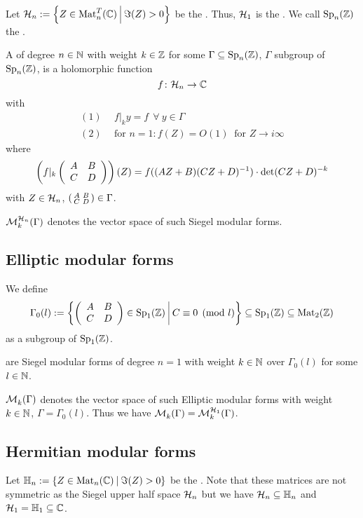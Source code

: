 Let $\SiegelHalfPlane_n := \Set{Z \in \M_n^T(\C)}{\Im(Z) > 0}$ be the .
Thus, $\mathcal{H}_1$ is the .
We call $\operatorname{Sp}_n(\mathbb{Z})$ the .


A  of degree $n\in\mathbb{N}$ with weight $k \in \mathbb{Z}$ for some $\Gamma \subseteq \operatorname{Sp}_n(\mathbb{Z})$, $\Gamma$ subgroup of $\operatorname{Sp}_n(\mathbb{Z})$, is a holomorphic function
\[ f \colon \mathcal{H}_n \rightarrow \mathbb{C} \]
with
\begin{align*}
(1) \ \ & f |_k y = f \ \ \forall \ y \in \Gamma \\
(2) \ \ & \text{for } n = 1 \colon f(Z) = O(1) \ \text{ for } Z \rightarrow i \infty
\end{align*}
where
\[ \left( f|_k \left( \begin{array}{cc} A & B \\ C & D \end{array} \right) \right) (Z) =
f((AZ + B)(CZ + D)^{-1}) \cdot \det(CZ + D)^{-k} \]
with $Z \in \mathcal{H}_n$, $\left( \begin{smallmatrix} A & B \\ C & D \end{smallmatrix} \right) \in \Gamma$.

$\operatorname{\mathcal{M}}^{\mathcal{H}_{n}}_k (\Gamma)$ denotes the vector space of such Siegel modular forms.

\subsection{Elliptic modular forms}

We define
\[ \Gamma_0(l) := \Set{\SimpleMatrix{A}{B}{C}{D} \in \Sp_1(\Z)}{C \equiv 0 \pmod{l}} \subseteq \Sp_1(\Z) \subseteq \M_2(\Z) \]
as a subgroup of $\operatorname{Sp}_1(\mathbb{Z})$.

 are Siegel modular forms of degree $n=1$ with weight $k \in \mathbb{N}$ over $\Gamma_0(l)$ for some $l \in \mathbb{N}$.

$\operatorname{\mathcal{M}}^{}_k (\Gamma)$ denotes the vector space of such Elliptic modular forms with weight $k \in \mathbb{N}$, $\Gamma = \Gamma_0(l)$. Thus we have $\operatorname{\mathcal{M}}^{}_k (\Gamma) = \operatorname{\mathcal{M}}^{\mathcal{H}_{1}}_k (\Gamma)$.

\subsection{Hermitian modular forms}

Let $\HalfPlane_n :=  \Set{ Z \in \M_n(\C) }{ \Im(Z) > 0}$ be the . Note that these matrices are not symmetric as the Siegel upper half space $\mathcal{H}_n$ but we have $\mathcal{H}_n \subseteq \mathbb{H}_n$ and $\mathcal{H}_1 = \mathbb{H}_1 \subseteq \mathbb{C}$.

